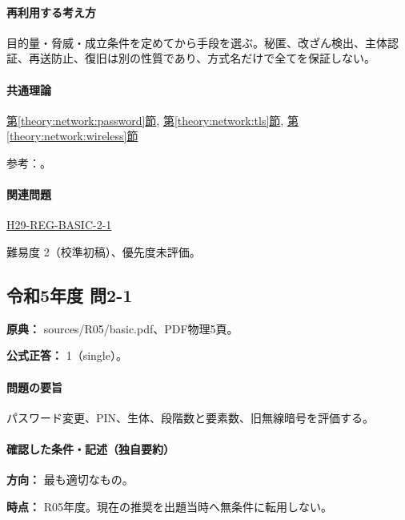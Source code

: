 \paragraph{再利用する考え方} 目的量・脅威・成立条件を定めてから手段を選ぶ。秘匿、改ざん検出、主体認証、再送防止、復旧は別の性質であり、方式名だけで全てを保証しない。

\paragraph{共通理論} \hyperref[theory:network:password]{第\ref*{theory:network:password}節}, \hyperref[theory:network:tls]{第\ref*{theory:network:tls}節}, \hyperref[theory:network:wireless]{第\ref*{theory:network:wireless}節}

\par 参考：\cite{net_ssl2015,net_ipa_account,net_wep}。

\paragraph{関連問題} \hyperref[q:h29-reg-basic-2-1]{H29-REG-BASIC-2-1}

\par 難易度 2（校準初稿）、優先度未評価。

\subsection{令和5年度 問2-1}
\label{q:r05-reg-basic-2-1}

\noindent\textbf{原典：} sources/R05/basic.pdf、PDF物理5頁。

\textbf{公式正答：} 1（single）。

\paragraph{問題の要旨} パスワード変更、PIN、生体、段階数と要素数、旧無線暗号を評価する。

\paragraph{確認した条件・記述（独自要約）}\mbox{}\par

\noindent\textbf{方向：} 最も適切なもの。\par

\noindent\textbf{時点：} R05年度。現在の推奨を出題当時へ無条件に転用しない。\par

